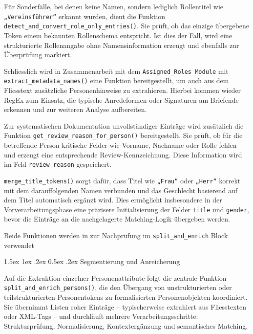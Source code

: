 \documentclass[12pt, a4paper, ngerman, bidi=default]{article}
\makeatletter
\newcommand{\code}[1]{\colorbox{VeryLightGray}{\texttt{#1}}} %
\let\oldparagraph\paragraph%
\renewcommand{\paragraph}{
    \@ifstar%
      \xxxParagraphStar%
      \xxxParagraphNoStar%
 }
\newcommand{\xxxParagraphStar}[1]{\oldparagraph*{#1}\mbox{}}
\newcommand{\xxxParagraphNoStar}[1]{\oldparagraph{#1}\mbox{}}
\renewcommand\paragraph{\@startsection{paragraph}{4}{0em}%
  {1.5ex \@plus1ex \@minus.2ex}%
  {0.5ex \@plus.2ex}%
  {\normalfont\normalsize\bfseries\itshape}}
\makeatother
\begin{document}
Für Sonderfälle, bei denen keine Namen, sondern lediglich Rollentitel wie \code{„Vereinsführer“} erkannt wurden, dient die Funktion \code{detect\_and\_convert\_role\_only\_entries()}. Sie prüft, ob das einzige übergebene Token einem bekannten Rollenschema entspricht. Ist dies der Fall, wird eine strukturierte Rollenangabe ohne Namensinformation erzeugt und ebenfalls zur Überprüfung markiert.

Schliesslich wird in Zusammenarbeit mit dem \code{Assigned\_Roles\_Module} mit \code{extract\_metadata\_names()} eine Funktion bereitgestellt, um auch aus dem Fliesstext zusätzliche Personenhinweise zu extrahieren. Hierbei kommen wieder RegEx zum Einsatz, die typische Anredeformen oder Signaturen am Briefende erkennen und zur weiteren Analyse aufbereiten.


Zur systematischen Dokumentation unvollständiger Einträge wird zusätzlich die Funktion \code{get\_review\_reason\_for\_person()} bereitgestellt. Sie prüft, ob für die betreffende Person kritische Felder wie Vorname, Nachname oder Rolle fehlen und erzeugt eine entsprechende Review-Kennzeichnung. Diese Information wird im Feld \code{review\_reason} gespeichert. 

\code{merge\_title\_tokens()} sorgt dafür, dass Titel wie \code{„Frau“} oder \code{„Herr“} korrekt mit dem darauffolgenden Namen verbunden und das Geschlecht basierend auf dem Titel automatisch ergänzt wird. Dies ermöglicht insbesondere in der Vorverarbeitungsphase eine präzisere Initialisierung der Felder \code{title} und \code{gender}, bevor die Einträge an die nachgelagerte Matching-Logik übergeben werden.

Beide Funktionen werden in zur  Nachprüfung im \code{split\_and\_enrich} Block verwendet


\paragraph{Segmentierung und Anreicherung}\label{paragraph:Pers_match/SplitEnrich}

Auf die Extraktion einzelner Personenattribute folgt die zentrale Funktion \code{split\_and\_enrich\_persons()}, die den Übergang von unstrukturierten oder teilstrukturierten Personentokens zu formalisierten Personenobjekten koordiniert. Sie übernimmt Listen roher Einträge – typischerweise extrahiert aus Fliesstexten oder XML-Tags – und durchläuft mehrere Verarbeitungsschritte: Strukturprüfung, Normalisierung, Kontextergänzung und semantisches Matching.
\end{document}
